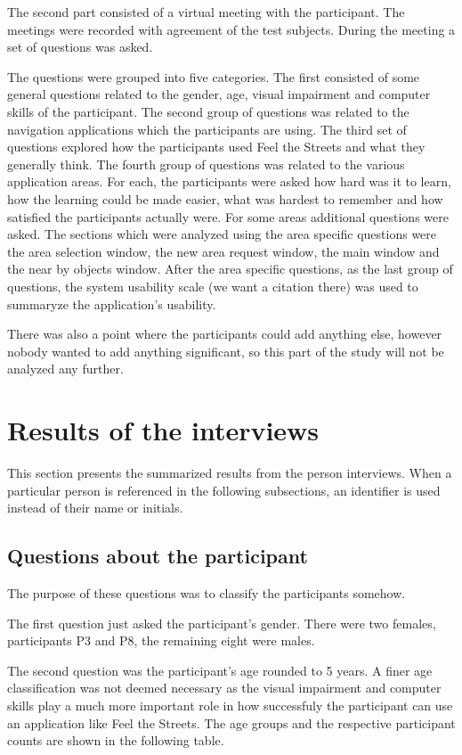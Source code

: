 \documentclass[nolof,digital]{fithesis3}
\begin{document}
The second part consisted of a virtual meeting with the participant. The meetings were recorded with agreement of the test subjects. During the meeting a set of questions was asked.

The questions were grouped into five categories. The first consisted of some general questions related to the gender, age, visual impairment and computer skills of the participant. The second group of questions was related to the navigation applications which the participants are using. The third set of questions explored how the participants used Feel the Streets and what they generally think. The fourth group of questions was related to the various application areas. For each, the participants were asked how hard was it to learn, how the learning could be made easier, what was hardest to remember and how satisfied the participants actually were. For some areas additional questions were asked. The sections which were analyzed using the area specific questions were the area selection window, the new area request window, the main window and the near by objects window. After the area specific questions, as the last group of questions, the system usability scale (we want a citation there) was used to summaryze the application's usability.

There was also a point where the participants could add anything else, however nobody wanted to add anything significant, so this part of the study will not be analyzed any further.
\section{Results of the interviews}
This section presents the summarized results from the person interviews. When a particular person is referenced in the following subsections, an identifier is used instead of their name or initials.
\subsection{Questions about the participant}
The purpose of these questions was to classify the participants somehow.

The first question just asked the participant's gender. There were two females, participants P3 and P8, the remaining eight were males.

The second question was the participant's age rounded to 5 years. A finer age classification was not deemed necessary as the visual impairment and computer skills play a much more important role in how successfuly the participant can use an application like Feel the Streets. The age groups and the respective participant counts are shown in the following table.
\end{document}
